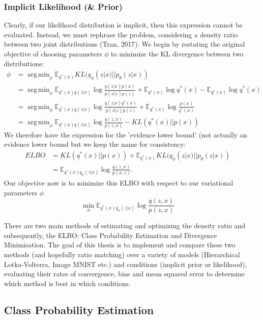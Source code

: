 \documentclass[a4paper,12pt]{article}
\DeclareMathOperator*{\argmin}{arg\,min}
\numberwithin{equation}{section}
\begin{document}
\subsubsection{Implicit Likelihood (\& Prior)}
Clearly, if our likelihood distribution is implicit, then this expression cannot be evaluated. Instead, we must rephrase the problem, considering a density ratio between two joint distributions  (Tran, 2017). We begin by restating the original objective of choosing parameters $\phi$ to minimize the KL divergence between two distributions:
\begin{align*}
\phi &=\argmin_\phi \mathbb{E}_{q^*(x)}KL(q_\phi(z|x)||p_\theta (z|x))\\
&=\argmin_\phi\mathbb{E}_{q^*(x)q(z|x)}\log \frac{q(z|x)p(x)}{p(x|z)p(z)}+\mathbb{E}_{q^*(x)}\log q^*(x)-\mathbb{E}_{q^*(x)}\log q^*(x)\\
&=\argmin_\phi\mathbb{E}_{q^*(x)q(z|x)}\log \frac{q(z|x)q^*(x)}{p(x|z)p(z)}+\mathbb{E}_{q^*(x)}\log \frac{p(x)}{q^*(x)}\\
&= \argmin_\phi\mathbb{E}_{q^*(x)q(z|x)}\log \frac{q(z,x)}{p(z,x)}-KL(q^*(x)||p(x))
\end{align*}
We therefore have the expression for the 'evidence lower bound' (not actually an evidence lower bound but we keep the name for consistency:
\begin{align*}
ELBO &= KL(q^*(x)||p(x))+\mathbb{E}_{q^*(x)}KL(q_\phi(z|x)||p_\theta(z|x))\\
&=\mathbb{E}_{q^*(x)q_\phi(z|x)}\log \frac{q(z,x)}{p(x,z)}.
\end{align*}
Our objective now is to minimize this ELBO with respect to our variational parameters $\phi$
\[\min_\phi \mathbb{E}_{q^*(x)q_\phi(z|x)}\log \frac{q(z,x)}{p(z,x)}\]

There are two main methods of estimating and optimizing the density ratio and subsequently, the ELBO: Class Probability Estimation and Divergence Minimisation. The goal of this thesis is to implement and compare these two methods (and hopefully ratio matching) over a variety of models (Hierarchical Lotka-Volterra, Image MNIST etc.) and conditions (implicit prior or likelihood), evaluating their rates of convergence, bias and mean squared error to determine which method is best in which conditions.
\newpage
\subsection{Class Probability Estimation}
\end{document}

